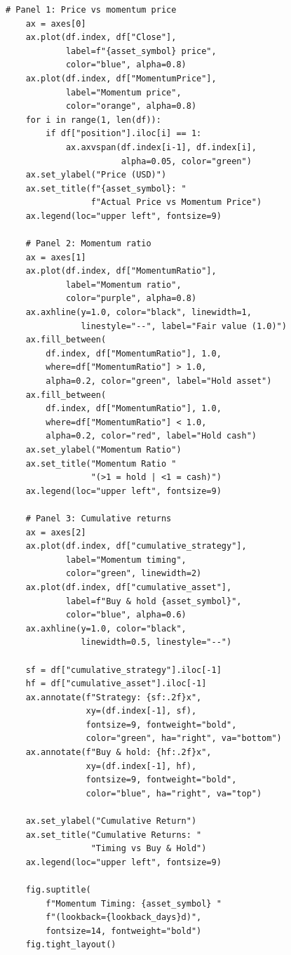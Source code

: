 \documentclass[11pt,a4paper]{article}
\begin{document}
\begin{codebox}
\begin{lstlisting}[style=python]
    # Panel 1: Price vs momentum price
    ax = axes[0]
    ax.plot(df.index, df["Close"],
            label=f"{asset_symbol} price",
            color="blue", alpha=0.8)
    ax.plot(df.index, df["MomentumPrice"],
            label="Momentum price",
            color="orange", alpha=0.8)
    for i in range(1, len(df)):
        if df["position"].iloc[i] == 1:
            ax.axvspan(df.index[i-1], df.index[i],
                       alpha=0.05, color="green")
    ax.set_ylabel("Price (USD)")
    ax.set_title(f"{asset_symbol}: "
                 f"Actual Price vs Momentum Price")
    ax.legend(loc="upper left", fontsize=9)

    # Panel 2: Momentum ratio
    ax = axes[1]
    ax.plot(df.index, df["MomentumRatio"],
            label="Momentum ratio",
            color="purple", alpha=0.8)
    ax.axhline(y=1.0, color="black", linewidth=1,
               linestyle="--", label="Fair value (1.0)")
    ax.fill_between(
        df.index, df["MomentumRatio"], 1.0,
        where=df["MomentumRatio"] > 1.0,
        alpha=0.2, color="green", label="Hold asset")
    ax.fill_between(
        df.index, df["MomentumRatio"], 1.0,
        where=df["MomentumRatio"] < 1.0,
        alpha=0.2, color="red", label="Hold cash")
    ax.set_ylabel("Momentum Ratio")
    ax.set_title("Momentum Ratio "
                 "(>1 = hold | <1 = cash)")
    ax.legend(loc="upper left", fontsize=9)

    # Panel 3: Cumulative returns
    ax = axes[2]
    ax.plot(df.index, df["cumulative_strategy"],
            label="Momentum timing",
            color="green", linewidth=2)
    ax.plot(df.index, df["cumulative_asset"],
            label=f"Buy & hold {asset_symbol}",
            color="blue", alpha=0.6)
    ax.axhline(y=1.0, color="black",
               linewidth=0.5, linestyle="--")

    sf = df["cumulative_strategy"].iloc[-1]
    hf = df["cumulative_asset"].iloc[-1]
    ax.annotate(f"Strategy: {sf:.2f}x",
                xy=(df.index[-1], sf),
                fontsize=9, fontweight="bold",
                color="green", ha="right", va="bottom")
    ax.annotate(f"Buy & hold: {hf:.2f}x",
                xy=(df.index[-1], hf),
                fontsize=9, fontweight="bold",
                color="blue", ha="right", va="top")

    ax.set_ylabel("Cumulative Return")
    ax.set_title("Cumulative Returns: "
                 "Timing vs Buy & Hold")
    ax.legend(loc="upper left", fontsize=9)

    fig.suptitle(
        f"Momentum Timing: {asset_symbol} "
        f"(lookback={lookback_days}d)",
        fontsize=14, fontweight="bold")
    fig.tight_layout()


\end{lstlisting}
\end{codebox}
\end{document}
